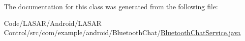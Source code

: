 The documentation for this class was generated from the following file\-:\begin{DoxyCompactItemize}
\item 
Code/\-L\-A\-S\-A\-R/\-Android/\-L\-A\-S\-A\-R Control/src/com/example/android/\-Bluetooth\-Chat/\hyperlink{_bluetooth_chat_service_8java}{Bluetooth\-Chat\-Service.\-java}\end{DoxyCompactItemize}
